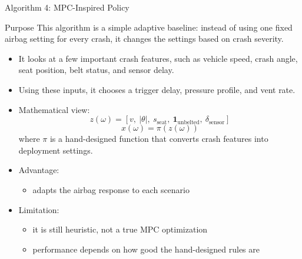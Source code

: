 \documentclass[aspectratio=169]{beamer}
\begin{document}
\begin{frame}{Algorithm 4: MPC-Inspired Policy}
  \small
  \begin{block}{Purpose}
    This algorithm is a simple adaptive baseline: instead of using one fixed airbag setting for every crash, it changes the settings based on crash severity.
  \end{block}

  \begin{itemize}
    \item It looks at a few important crash features, such as vehicle speed, crash angle, seat position, belt status, and sensor delay.
    \item Using these inputs, it chooses a trigger delay, pressure profile, and vent rate.
    \item Mathematical view:
    \[
    z(\omega) = [v,\ |\theta|,\ s_{\mathrm{seat}},\ \mathbf{1}_{\mathrm{unbelted}},\ \delta_{\mathrm{sensor}}]
    \]
    \[
    x(\omega) = \pi(z(\omega))
    \]
    where \(\pi\) is a hand-designed function that converts crash features into deployment settings.
    \item Advantage:
    \begin{itemize}
      \item adapts the airbag response to each scenario
    \end{itemize}
    \item Limitation:
    \begin{itemize}
      \item it is still heuristic, not a true MPC optimization
      \item performance depends on how good the hand-designed rules are
    \end{itemize}
  \end{itemize}
\end{frame}
\end{document}
